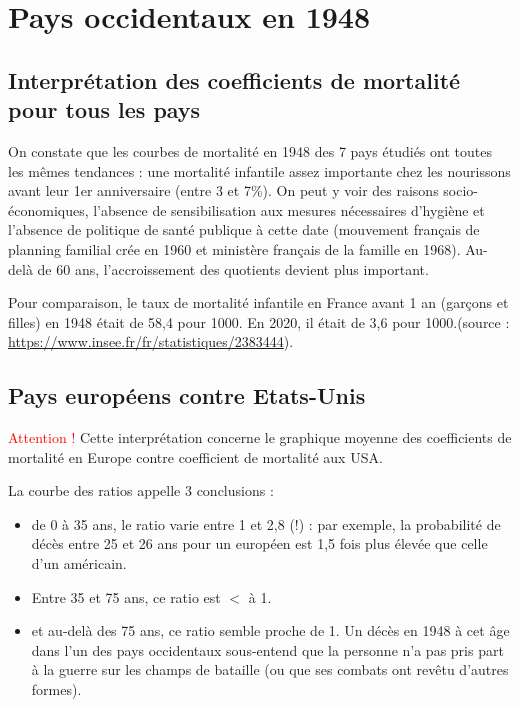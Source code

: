 \documentclass{article}
\begin{document}



\setcounter{section}{3}

\section{Pays occidentaux en 1948}


\subsection{Interprétation des coefficients de mortalité pour tous les pays}

\noindent On constate que les courbes de mortalité en 1948 des 7 pays étudiés ont toutes les mêmes tendances : une mortalité infantile assez importante chez les nourissons avant leur 1er anniversaire (entre 3 et 7\%). On peut y voir des raisons socio-économiques, l'absence de sensibilisation aux mesures nécessaires d'hygiène et l'absence de politique de santé publique à cette date (mouvement français de planning familial crée en 1960 et ministère français de la famille en 1968). Au-delà de 60 ans, l'accroissement des quotients devient plus important.

\vspace{0.4cm}

\noindent Pour comparaison, le taux de mortalité infantile en France avant 1 an (garçons et filles) en 1948 était de 58,4 pour 1000. En 2020, il était de 3,6 pour 1000.\newline\noindent (source : \url{https://www.insee.fr/fr/statistiques/2383444}).


\subsection{Pays européens contre Etats-Unis}

\noindent\textdbend\textcolor{red}{Attention !} Cette interprétation concerne le graphique moyenne des coefficients de mortalité en Europe contre coefficient de mortalité aux USA.

\vspace{0.4cm}

\noindent La courbe des ratios appelle $3$ conclusions :

\begin{itemize}

\item de 0 à 35 ans, le ratio varie entre 1 et 2,8 (!) : par exemple, la probabilité de décès entre 25 et 26 ans pour un européen est 1,5 fois plus élevée que celle d'un américain.

\item Entre 35 et 75 ans, ce ratio est $<$ à 1.

\item et au-delà des 75 ans, ce ratio semble proche de 1. Un décès en 1948 à cet âge dans l'un des pays occidentaux sous-entend que la personne n'a pas pris part à la guerre sur les champs de bataille (ou que ses combats ont revêtu d'autres formes).

\end{itemize}
\end{document}
